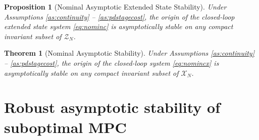 \documentclass{article}
\newtheorem{theorem}{Theorem}
\newtheorem{proposition}{Proposition}
\begin{document}
\begin{proposition}[Nominal Asymptotic Extended State Stability]
\label{pp:nominalstability}
Under Assumptions \ref{as:continuity} -- \ref{as:pdstagecost}, the origin of the closed-loop extended state
system \eqref{eq:nominc} is asymptotically stable on any compact invariant
subset of $\mathcal{Z}_N$.
\end{proposition}
\begin{theorem}[Nominal Asymptotic Stability]
\label{th:nominalstability}
Under Assumptions \ref{as:continuity} -- \ref{as:pdstagecost}, the origin of the closed-loop
system \eqref{eq:nomincx} is asymptotically stable on any compact
invariant subset of $\mathcal{X}_N$.
\end{theorem}

\section{Robust asymptotic stability of suboptimal MPC}
\end{document}
